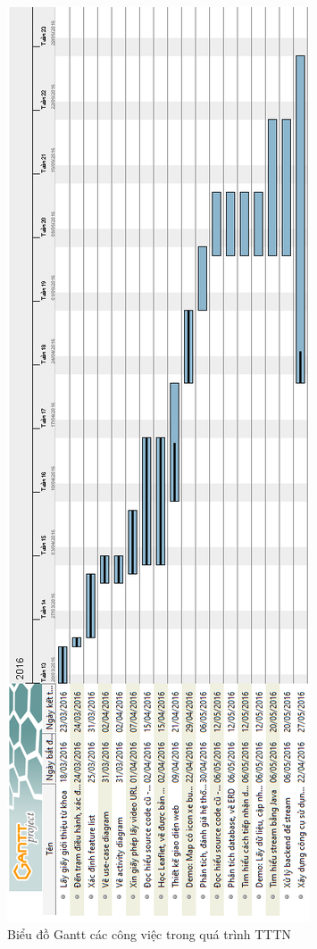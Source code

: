 \begin{figure}[H]
	\centering
	\includegraphics[scale=.6]{Graphics/gantt}
	\caption{Biểu đồ Gantt các công việc trong quá trình TTTN}
\end{figure}

